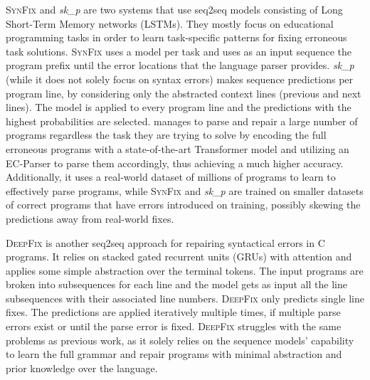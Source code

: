 %
\textsc{SynFix} \citep{Bhatia2016} and \emph{sk\_p} \citep{Pu2016} are two
systems that use seq2seq models consisting of Long Short-Term Memory networks
(LSTMs). They mostly focus on educational programming tasks in order to learn
task-specific patterns for fixing erroneous task solutions. \textsc{SynFix} uses
a model per task and uses as an input sequence the program prefix until the
error locations that the language parser provides. \emph{sk\_p} (while it
does not solely focus on syntax errors) makes sequence predictions per program
line, by considering only the abstracted context lines (previous and next
lines). The model is applied to every program line and the predictions with the
highest probabilities are selected. \toolname manages to parse and repair a
large number of programs regardless the task they are trying to solve by
encoding the full erroneous programs with a state-of-the-art Transformer model
and utilizing an EC-Parser to parse them accordingly, thus achieving a much
higher accuracy. Additionally, it uses a real-world dataset of millions of
\python programs to learn to effectively parse programs, while \textsc{SynFix}
and \emph{sk\_p} are trained on smaller datasets of correct programs that have
errors introduced on training, possibly skewing the predictions away from
real-world fixes.

\textsc{DeepFix} \citep{Gupta2017} is another seq2seq approach for repairing
syntactical errors in \textsc{C} programs. It relies on stacked gated recurrent
units (GRUs) with attention and applies some simple abstraction over the
terminal tokens. The input programs are broken into subsequences for each line
and the model gets as input all the line subsequences with their associated line
numbers. \textsc{DeepFix} only predicts single line fixes.
The predictions are applied iteratively multiple times, if multiple
parse errors exist or until the parse error is fixed. \textsc{DeepFix} struggles
with the same problems as previous work, as it solely relies on the sequence
models' capability to learn the full grammar and repair programs with minimal
abstraction and prior knowledge over the language.

